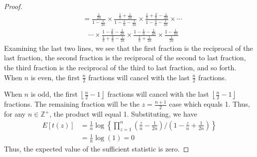 \documentclass[12pt]{article}
\theoremstyle{plain}
\begin{document}
\begin{appendix}
\begin{proof}
\begin{align*}
	&= \frac{\frac{1}{2n}}{1-\frac{1}{2n}} \times \frac{\frac{1}{n} + \frac{1}{2n}}{1-\frac{1}{n} -  \frac{1}{2n}} \times \frac{\frac{1}{n} + \frac{2}{n} - \frac{1}{2n}}{1 - \frac{2}{n} - \frac{1}{2n}} \times \cdots\\
	&\hspace{10pt}\cdots \times \frac{1 - \frac{2}{n} - \frac{1}{2n}}{\frac{1}{n} + \frac{2}{n} - \frac{1}{2n}} \times \frac{1 -\frac{1}{n} - \frac{1}{2n}}{\frac{1}{n} + \frac{1}{2n}} \times \frac{1 - \frac{1}{2n}}{\frac{1}{2n}}
\end{align*}
Examining the last two lines, we see that the first fraction is the reciprocal of the last fraction, the second fraction is the reciprocal of the second to last fraction, the third fraction is the reciprocal of the third to last fraction, and so forth. When $n$ is even, the first $\frac{n}{2}$ fractions will cancel with the last $\frac{n}{2}$ fractions. 

When $n$ is odd, the first $\left\lfloor\frac{n}{2} - 1\right\rfloor$ fractions will cancel with the last $\left\lfloor\frac{n}{2} - 1\right\rfloor$ fractions. The remaining fraction will be the $z = \frac{n+1}{2}$ case which equals 1. Thus, for any $n \in \mathbb{Z}^+$, the product will equal 1. Substituting, we have
\begin{align*}
	E\left[ t(z) \right] &= \frac{1}{n} \log \left\{ \prod_{z = 1}^n \left(\frac{z}{n} - \frac{1}{2n}\right) \bigg/ \left(1-\frac{z}{n} + \frac{1}{2n}\right) \right\} \\
	&= \frac{1}{n} \log(1) = 0
\end{align*}
Thus, the expected value of the sufficient statistic is zero.
\end{proof}


\end{appendix}

\end{document}
